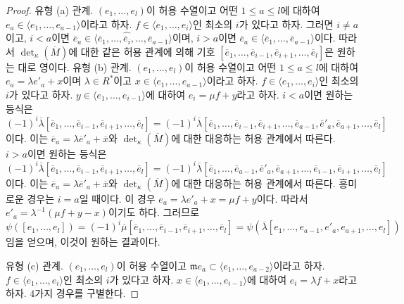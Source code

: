 \begin{proof}
\medskip\noindent
유형 (a) 관계. $(e_1, \ldots, e_l)$이 허용 수열이고 어떤
$1 \leq a \leq l$에 대하여
$e_a \in \langle e_1, \ldots, e_{a - 1}\rangle$이라고 하자.
$f \in \langle e_1, \ldots, e_i\rangle$인 최소의 $i$가 있다고 하자.
그러면 $i \not = a$이고, $i < a$이면
$\overline{e}_a \in \langle \overline{e}_1, \ldots,
\hat{\overline{e}_i}, \ldots, \overline{e}_{a - 1}\rangle$이며,
$i > a$이면
$\overline{e}_a \in \langle \overline{e}_1, \ldots,
\overline{e}_{a - 1}\rangle$이다. 따라서
$\det_\kappa(\overline{M})$에 대한 같은 허용 관계에 의해 기호
$[\overline{e}_1, \ldots,
\overline{e}_{i - 1},
\overline{e}_{i + 1}, \ldots, \overline{e}_l]$은 원하는 대로 영이다.
\medskip\noindent
유형 (b) 관계. $(e_1, \ldots, e_l)$이 허용 수열이고 어떤
$1 \leq a \leq l$에 대하여
$e_a = \lambda e'_a + x$이며 $\lambda \in R^*$이고
$x \in \langle e_1, \ldots, e_{a - 1}\rangle$이라고 하자.
$f \in \langle e_1, \ldots, e_i\rangle$인 최소의 $i$가 있다고 하자.
$y \in \langle e_1, \ldots, e_{i - 1}\rangle$에 대하여
$e_i = \mu f + y$라고 하자. $i < a$이면 원하는 등식은
$$
(-1)^i
\overline{\lambda}
[\overline{e}_1,
\ldots,
\overline{e}_{i - 1},
\overline{e}_{i + 1},
\ldots,
\overline{e}_l]
=
(-1)^i
\overline{\lambda}
[\overline{e}_1,
\ldots,
\overline{e}_{i - 1},
\overline{e}_{i + 1},
\ldots,
\overline{e}_{a - 1},
\overline{e}'_a,
\overline{e}_{a + 1},
\ldots,
\overline{e}_l]
$$
이다. 이는
$\overline{e}_a = \lambda \overline{e}'_a + \overline{x}$와
$\det_\kappa(\overline{M})$에 대한 대응하는 허용 관계에서 따른다.
$i > a$이면 원하는 등식은
$$
(-1)^i
\overline{\lambda}
[\overline{e}_1,
\ldots,
\overline{e}_{i - 1},
\overline{e}_{i + 1},
\ldots,
\overline{e}_l]
=
(-1)^i
\overline{\lambda}
[\overline{e}_1,
\ldots,
\overline{e}_{a - 1},
\overline{e}'_a,
\overline{e}_{a + 1},
\ldots,
\overline{e}_{i - 1},
\overline{e}_{i + 1},
\ldots,
\overline{e}_l]
$$
이다. 이는
$\overline{e}_a = \lambda \overline{e}'_a + \overline{x}$와
$\det_\kappa(\overline{M})$에 대한 대응하는 허용 관계에서 따른다.
흥미로운 경우는 $i = a$일 때이다. 이 경우
$e_a = \lambda e'_a + x = \mu f + y$이다. 따라서
$e'_a = \lambda^{-1}(\mu f + y - x)$이기도 하다. 그러므로
$$
\psi([e_1, \ldots, e_l])
= (-1)^i \overline{\mu}
[\overline{e}_1, \ldots,
\overline{e}_{i - 1},
\overline{e}_{i + 1}, \ldots, \overline{e}_l]
=
\psi(
\overline{\lambda}
[e_1, \ldots, e_{a - 1}, e'_a, e_{a + 1}, \ldots, e_l]
)
$$
임을 얻으며, 이것이 원하는 결과이다.

\medskip\noindent
유형 (c) 관계. $(e_1, \ldots, e_l)$이 허용 수열이고
$\mathfrak m e_a \subset \langle e_1, \ldots, e_{a - 2}\rangle$이라고
하자. $f \in \langle e_1, \ldots, e_i\rangle$인 최소의 $i$가 있다고
하자. $x \in \langle e_1, \ldots, e_{i - 1}\rangle$에 대하여
$e_i = \lambda f + x$라고 하자. $4$가지 경우를 구별한다.


\end{proof}
